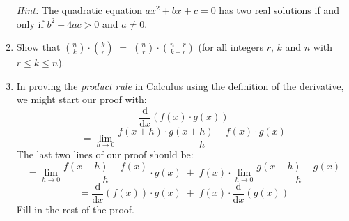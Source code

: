 \documentclass[10pt,]{book}
\theoremstyle{plain}
\theoremstyle{definition}
\theoremstyle{definition}
\numberwithin{equation}{section}
\newcommand{\hint}[1]{ }
\begin{document}
\begin{enumerate}[label=(\alph*)]
          \emph{Hint:} The quadratic equation \(ax^{2}+bx+c=0\) has two
          real solutions if and only if \(b^{2}-4ac>0\) and \(a\neq0\).

          \hint{This is very similar to \hyperlink{quad}{problem~b}.}
\item\hypertarget{li-251}{}
          Show that \(\binom{n}{k} \cdot \binom{k}{r} \; = \; \binom{n}{r} \cdot \binom{n-r}{k-r}\) (for all integers \(r\), \(k\) and \(n\) with \(r \leq k \leq n\)). 

          \hint{Use the definition of the binomial coefficients as fractions involving factorials:

          E.g. \(\displaystyle\binom{n}{k} \; = \; \frac{n!}{k! (n-k)!}\)

          Write down the definitions, both of the left hand side and the right hand side and consider how you can
          convert one into the other.}
\item\hypertarget{li-252}{}
          In proving the  \emph{product rule} in Calculus using the definition of the derivative, we might start our proof with:
          \begin{equation*}
            \frac{\mbox{d} }{\mbox{d} x} \left( f(x) \cdot g(x) \right)
          \end{equation*}
          \begin{equation*}
            = \lim_{h \longrightarrow 0} \frac{f(x+h) \cdot g(x+h) - f(x) \cdot g(x)}{h}
          \end{equation*}
          The last two lines of our proof should be:
          \begin{equation*}
            = \lim_{h \longrightarrow 0} \frac{f(x+h) - f(x)}{h} \cdot g(x) \; + \; f(x) \cdot \lim_{h \longrightarrow 0} \frac{g(x+h) - g(x)}{h}
          \end{equation*}
          \begin{equation*}
            = \frac{\mbox{d} }{\mbox{d} x}\left( f(x) \right) \cdot g(x) \; + \; f(x) \cdot \frac{\mbox{d} }{\mbox{d} x}\left( g(x) \right)
          \end{equation*}
          Fill in the rest of the proof.

          \hint{The critical step is to subtract and add the same thing: \(f(x)g(x+h)\) in the numerator of the fraction
          in the limit which gives the definition of \(\frac{\mbox{d} }{\mbox{d} x} \left( f(x) \cdot g(x) \right)\).  Also, you'll need to recall the laws of limits (like ``the limit of a product is the product of the limits \textemdash{} provided both exist'') }
\end{enumerate}
\typeout{************************************************}
\typeout{************************************************}
\end{document}
